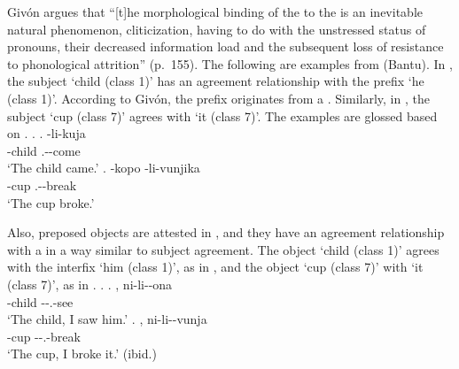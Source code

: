 Giv\'{o}n argues that
``[t]he morphological binding of the  to the  is an inevitable natural phenomenon, cliticization,
having to do with the unstressed status of pronouns, their decreased information load and the subsequent loss of resistance to phonological attrition'' (p.~155).
The following are examples from  (Bantu).
In \Next[a],
the subject  `child (class 1)' has an agreement relationship with the  prefix  `he (class 1)'.
According to Giv\'{o}n,
the  prefix  originates from a .
Similarly, in \Next[b],
the subject  `cup (class 7)' agrees with  `it (class 7)'.
The examples are glossed based on .
%
\ex.
 \ag.  -li-kuja \\
      -child .--come \\
      `The child came.'
 \bg. -kopo -li-vunjika \\
      -cup .--break \\
      `The cup broke.'
 \hfill{\cite[157]{givon76}}

Also, preposed objects are attested in ,
and they have an agreement relationship with a   in a way similar to subject agreement.
The object  `child (class 1)' agrees with the interfix  `him (class 1)', as in \Next[a], and
the object  `cup (class 7)' with  `it (class 7)', as in \Next[b].
%
\ex.
 \ag. , ni-li--ona \\
      -child --.-see \\
      `The child, I saw him.'
 \bg. , ni-li--vunja \\
      -cup --.-break \\
      `The cup, I broke it.'
      \hfill{(ibid.)}
      
